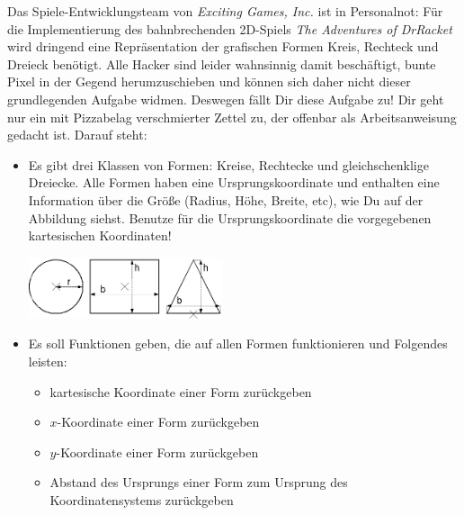 \begin{aufgabe}

  Das Spiele-Entwicklungsteam von
  \textit{Exciting Games, Inc.} ist in Personalnot: Für die
  Implementierung des bahnbrechenden 2D-Spiels \textit{The Adventures
    of DrRacket} wird dringend eine Repräsentation der grafischen
  Formen Kreis, Rechteck und Dreieck benötigt.  Alle Hacker
  sind leider wahnsinnig damit beschäftigt, bunte Pixel in der Gegend
  herumzuschieben und können sich daher nicht dieser grundlegenden
  Aufgabe widmen.  Deswegen fällt Dir diese Aufgabe zu!  Dir geht
  nur ein mit Pizzabelag verschmierter Zettel zu, der offenbar als
  Arbeitsanweisung gedacht ist.  Darauf steht:
  \begin{itemize}

  \item Es gibt drei Klassen von Formen: Kreise, Rechtecke und
    gleichschenklige Dreiecke.  Alle Formen haben eine
    Ursprungskoordinate und enthalten eine Information über die Größe
    (Radius, Höhe, Breite, etc), wie Du auf der Abbildung siehst.
    Benutze für die Ursprungskoordinate die vorgegebenen kartesischen
    Koordinaten!

    \begin{center}
      \includegraphics[height=1.8cm]{i1gem/shapes.png}
    \end{center}

  \item Es soll Funktionen geben, die auf allen Formen funktionieren
    und Folgendes leisten:

    \begin{itemize}

    \item kartesische Koordinate einer Form zurückgeben

    \item $x$-Koordinate einer Form zurückgeben

    \item $y$-Koordinate einer Form zurückgeben

    \item Abstand des Ursprungs einer Form zum Ursprung des
      Koordinatensystems zurückgeben


\end{itemize}
\end{itemize}
\end{aufgabe}
